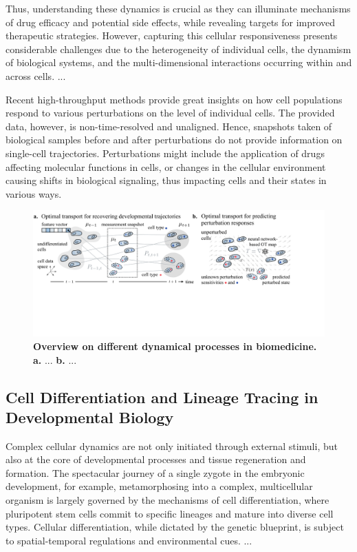 Thus, understanding these dynamics is crucial as they can illuminate mechanisms of drug efficacy and potential side effects, while revealing targets for improved therapeutic strategies. However, capturing this cellular responsiveness presents considerable challenges due to the heterogeneity of individual cells, the dynamism of biological systems, and the multi-dimensional interactions occurring within and across cells.
...

Recent high-throughput methods provide great insights on how cell populations respond to various perturbations on the level of individual cells. The provided data, however, is non-time-resolved and unaligned. 
Hence, snapshots taken of biological samples before and after perturbations do not provide information on single-cell trajectories.
Perturbations might include the application of drugs affecting molecular functions in cells, or changes in the cellular environment causing shifts in biological signaling, thus impacting cells and their states in various ways.

\begin{figure}[t]
  \includegraphics[width=\textwidth]{figures/fig_bio_problems.pdf}
  \caption{\textbf{Overview on different dynamical processes in biomedicine.} \textbf{a.} ... \textbf{b.} ...}	
  \label{fig:bio_problems}
\end{figure}


\subsection{Cell Differentiation and Lineage Tracing in Developmental Biology}
\label{sec:cell_differentiation}

Complex cellular dynamics are not only initiated through external stimuli, but also at the core of developmental processes and tissue regeneration and formation.
The spectacular journey of a single zygote in the embryonic development, for example, metamorphosing into a complex, multicellular organism is largely governed by the mechanisms of cell differentiation, where pluripotent stem cells commit to specific lineages and mature into diverse cell types.
Cellular differentiation, while dictated by the genetic blueprint, is subject to spatial-temporal regulations and environmental cues.
...

